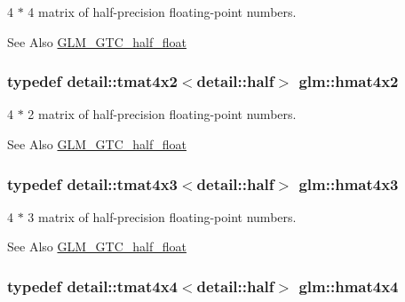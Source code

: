 4 $\ast$ 4 matrix of half-\/precision floating-\/point numbers. 

\begin{DoxySeeAlso}{See Also}
\hyperlink{group__gtc__half__float}{G\-L\-M\-\_\-\-G\-T\-C\-\_\-half\-\_\-float} 
\end{DoxySeeAlso}
\hypertarget{group__gtc__half__float_gadaf0a1837917e1b87a5269b379f90e33}{
\subsubsection[{hmat4x2}]{\setlength{\rightskip}{0pt plus 5cm}typedef detail\-::tmat4x2$<$detail\-::half$>$ {\bf glm\-::hmat4x2}}}\label{group__gtc__half__float_gadaf0a1837917e1b87a5269b379f90e33}


4 $\ast$ 2 matrix of half-\/precision floating-\/point numbers. 

\begin{DoxySeeAlso}{See Also}
\hyperlink{group__gtc__half__float}{G\-L\-M\-\_\-\-G\-T\-C\-\_\-half\-\_\-float} 
\end{DoxySeeAlso}
\hypertarget{group__gtc__half__float_ga44cb3a8fb375a76fc6ccb2f0add2bcf2}{
\subsubsection[{hmat4x3}]{\setlength{\rightskip}{0pt plus 5cm}typedef detail\-::tmat4x3$<$detail\-::half$>$ {\bf glm\-::hmat4x3}}}\label{group__gtc__half__float_ga44cb3a8fb375a76fc6ccb2f0add2bcf2}


4 $\ast$ 3 matrix of half-\/precision floating-\/point numbers. 

\begin{DoxySeeAlso}{See Also}
\hyperlink{group__gtc__half__float}{G\-L\-M\-\_\-\-G\-T\-C\-\_\-half\-\_\-float} 
\end{DoxySeeAlso}
\hypertarget{group__gtc__half__float_gabf1d2a56f968368a22222ab03fedf67f}{
\subsubsection[{hmat4x4}]{\setlength{\rightskip}{0pt plus 5cm}typedef detail\-::tmat4x4$<$detail\-::half$>$ {\bf glm\-::hmat4x4}}}\label{group__gtc__half__float_gabf1d2a56f968368a22222ab03fedf67f}


